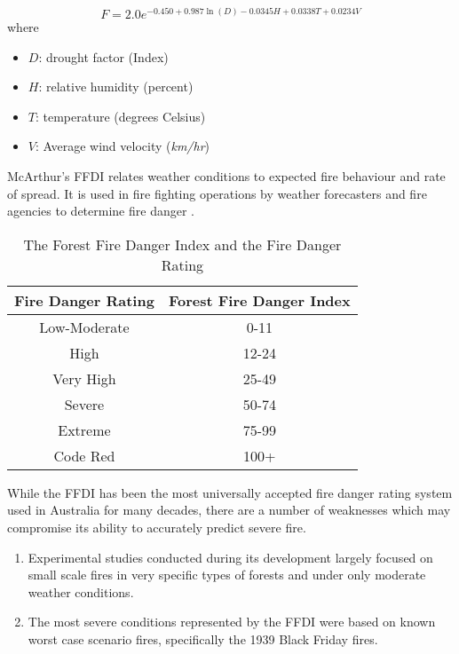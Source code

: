 \documentclass[11pt,a4paper]{article}
\begin{document}
\begin{equation}
\label{eq FFDI}
F=2.0 e^{-0.450 + 0.987 \ln(D)-0.0345H+0.0338T+0.0234V}
\end{equation}
where 
\begin{itemize}
	\item $D$: drought factor (Index)
	\item $H$: relative humidity (percent)
	\item $T$: temperature (degrees Celsius)
	\item $V$: Average wind velocity (\emph{km/hr})
\end{itemize}

McArthur's FFDI relates weather conditions to expected fire behaviour and rate of spread. It is used in fire fighting operations by weather forecasters and fire agencies to determine fire danger \citep{clarke2013}. 

\begin{table}[ht]
	\centering
	\begin{tabular}{|c|c|}
		\hline Fire Danger Rating & Forest Fire Danger Index \\ 
		\hline
		Low-Moderate  & 0-11 \\ 
		High  &  12-24 \\ 
		Very High  &  25-49\\ 
		Severe &  50-74\\ 
		Extreme  &  75-99 \\ 
		Code Red  &  100+ \\ 
		\hline 
	\end{tabular}
	\caption{The Forest Fire Danger Index and the Fire Danger Rating}
	\label{table:FDR}
\end{table}

While the FFDI has been the most universally accepted fire danger rating system used in Australia for many decades, there are a number of weaknesses which may compromise its ability to accurately predict severe fire. 

\begin{enumerate}
	\item Experimental studies conducted during its development largely focused on small scale fires in very specific types of forests and under only moderate weather conditions. 
	\item The most severe conditions represented by the FFDI were based on known worst case scenario fires, specifically the 1939 Black Friday fires.
\end{enumerate}
\end{document}
